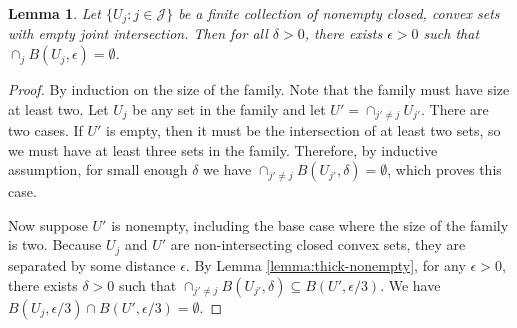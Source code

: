 \documentclass{article}
\newtheorem{lemma}{Lemma}
\begin{document}
\begin{lemma} \label{lemma:thick-empty}
  Let $\{U_j : j \in \mathcal{J}\}$ be a finite collection of nonempty closed, convex sets with empty joint intersection.
  Then for all $\delta > 0$, there exists  $\epsilon > 0$ such that $\cap_j B(U_j,\epsilon) = \emptyset$.
\end{lemma}
\begin{proof}
  By induction on the size of the family.
  Note that the family must have size at least two.
  Let $U_j$ be any set in the family and let $U' = \cap_{j' \neq j} U_{j'}$.
  There are two cases.
  If $U'$ is empty, then it must be the intersection of at least two sets, so we must have at least three sets in the family.
  Therefore, by inductive assumption, for small enough $\delta$ we have $\cap_{j' \neq j} B(U_{j'},\delta) = \emptyset$, which proves this case.

  Now suppose $U'$ is nonempty, including the base case where the size of the family is two.
  Because $U_j$ and $U'$ are non-intersecting closed convex sets, they are separated by some distance $\epsilon$.
  By Lemma \ref{lemma:thick-nonempty}, for any $\epsilon > 0$, there exists $\delta > 0$ such that $\cap_{j'\neq j} B(U_{j'},\delta) \subseteq B(U', \epsilon/3)$.
  We have $B(U_j, \epsilon/3) \cap B(U', \epsilon/3) = \emptyset$.
\end{proof}
\end{document}
